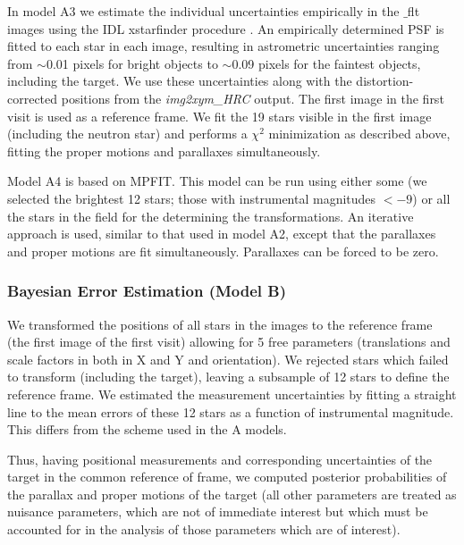 \documentclass[12pt,preprint]{aastex}
\begin{document}
In model A3 we estimate the individual uncertainties empirically 
in the $\_$flt images using the
IDL xstarfinder procedure \citep{DB00}.
An empirically determined PSF is fitted to each star in each image, resulting
in astrometric uncertainties ranging from $\sim$0.01 pixels for bright objects
to $\sim$0.09 pixels for the faintest objects, including the target.
We use these uncertainties along with the distortion-corrected positions
from the {\it img2xym\_HRC} output.
The first image in the first visit is used as a reference frame. We fit 
the 19 stars visible in the first image (including the neutron star) and
performs a $\chi^2$ minimization as described above, fitting the proper motions
and parallaxes simultaneously. 


Model A4 is based on MPFIT.
This model can be run using either some
(we selected the brightest 12 stars; those
with instrumental magnitudes $< -9$)
or all the stars in the field for the determining the transformations.
An iterative approach is used, similar to that used in model A2, except that
the parallaxes and proper motions are fit simultaneously. Parallaxes can be
forced to be zero.


\subsubsection{Bayesian Error Estimation (Model B)}

We transformed the positions of all stars in the images to the reference frame
(the first image of the first visit) allowing for 5 free parameters
(translations and scale factors in both in X and Y and orientation). We rejected
stars which failed to transform (including the target), leaving a subsample
of 12 stars to define the reference frame. We estimated the measurement
uncertainties by fitting a straight line to the mean errors of these 12 stars
as a function of instrumental magnitude. This differs from the scheme used
in the A models.

Thus, having positional measurements and corresponding uncertainties
of the target in the common reference of frame,
we computed posterior probabilities of the
parallax and proper motions of the target
(all other parameters are treated as nuisance parameters, which are
 not of immediate interest but which must be accounted for in the analysis 
of those parameters which are of interest). 
\end{document}
